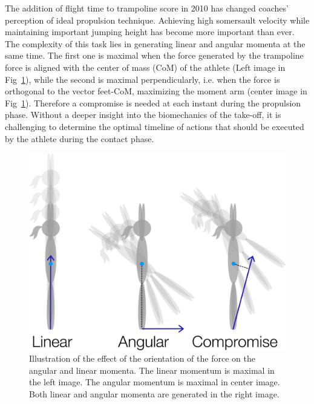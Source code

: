 
The addition of flight time to trampoline score in 2010 \cite{Committee2010} has changed coaches' perception of ideal propulsion technique.
Achieving high somersault velocity while maintaining important jumping height has become more important than ever.
The complexity of this task lies in generating linear and angular momenta at the same time.
The first one is maximal when the force generated by the trampoline force is aligned with the center of mass (CoM) of the athlete (Left image in Fig~\ref{fig:Linear_vs_angular_mom}), while the second is maximal perpendicularly, i.e. when the force is orthogonal to the vector feet-CoM, maximizing the moment arm (center image in Fig~\ref{fig:Linear_vs_angular_mom}).
Therefore a compromise is needed at each instant during the propulsion phase.
Without a deeper insight into the biomechanics of the take-off, it is challenging to determine the optimal timeline of actions that should be executed by the athlete during the contact phase.

\begin{figure}[h!]
\centering
\includegraphics[width=0.8\linewidth]{figures/Linear_vs_angular_mom.png}
\caption{Illustration of the effect of the orientation of the force on the angular and linear momenta. 
The linear momentum is maximal in the left image. 
The angular momentum is maximal in center image. 
Both linear and angular momenta are generated in the right image.}
\label{fig:Linear_vs_angular_mom}
\end{figure}

